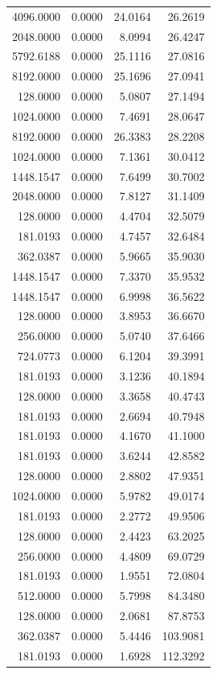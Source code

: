 \begin{tabular}{rrrr}
4096.0000 & 0.0000 & 24.0164 & 26.2619 \\
2048.0000 & 0.0000 & 8.0994 & 26.4247 \\
5792.6188 & 0.0000 & 25.1116 & 27.0816 \\
8192.0000 & 0.0000 & 25.1696 & 27.0941 \\
128.0000 & 0.0000 & 5.0807 & 27.1494 \\
1024.0000 & 0.0000 & 7.4691 & 28.0647 \\
8192.0000 & 0.0000 & 26.3383 & 28.2208 \\
1024.0000 & 0.0000 & 7.1361 & 30.0412 \\
1448.1547 & 0.0000 & 7.6499 & 30.7002 \\
2048.0000 & 0.0000 & 7.8127 & 31.1409 \\
128.0000 & 0.0000 & 4.4704 & 32.5079 \\
181.0193 & 0.0000 & 4.7457 & 32.6484 \\
362.0387 & 0.0000 & 5.9665 & 35.9030 \\
1448.1547 & 0.0000 & 7.3370 & 35.9532 \\
1448.1547 & 0.0000 & 6.9998 & 36.5622 \\
128.0000 & 0.0000 & 3.8953 & 36.6670 \\
256.0000 & 0.0000 & 5.0740 & 37.6466 \\
724.0773 & 0.0000 & 6.1204 & 39.3991 \\
181.0193 & 0.0000 & 3.1236 & 40.1894 \\
128.0000 & 0.0000 & 3.3658 & 40.4743 \\
181.0193 & 0.0000 & 2.6694 & 40.7948 \\
181.0193 & 0.0000 & 4.1670 & 41.1000 \\
181.0193 & 0.0000 & 3.6244 & 42.8582 \\
128.0000 & 0.0000 & 2.8802 & 47.9351 \\
1024.0000 & 0.0000 & 5.9782 & 49.0174 \\
181.0193 & 0.0000 & 2.2772 & 49.9506 \\
128.0000 & 0.0000 & 2.4423 & 63.2025 \\
256.0000 & 0.0000 & 4.4809 & 69.0729 \\
181.0193 & 0.0000 & 1.9551 & 72.0804 \\
512.0000 & 0.0000 & 5.7998 & 84.3480 \\
128.0000 & 0.0000 & 2.0681 & 87.8753 \\
362.0387 & 0.0000 & 5.4446 & 103.9081 \\
181.0193 & 0.0000 & 1.6928 & 112.3292 \\

\end{tabular}

